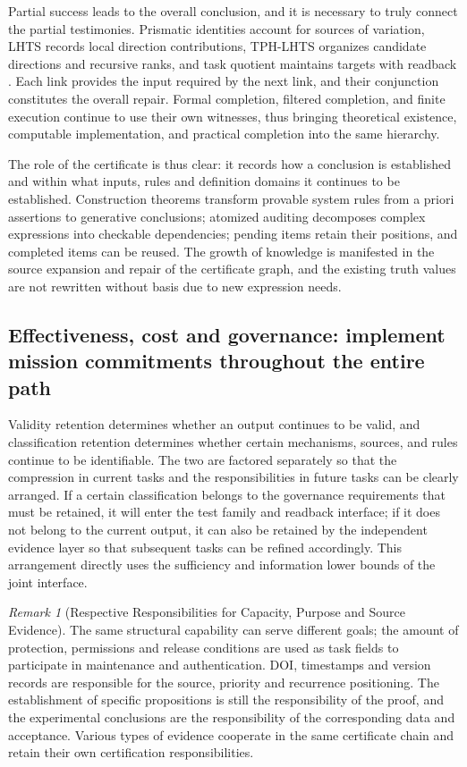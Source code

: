 \documentclass[11pt,a4paper]{article}
\theoremstyle{plain}
\theoremstyle{definition}
\theoremstyle{remark}
\newtheorem{remark}[theorem]{Remark}
\begin{document}
\begin{CJK*}
Partial success leads to the overall conclusion, and it is necessary to truly connect the partial testimonies. Prismatic identities account for sources of variation, LHTS records local direction contributions, TPH-LHTS organizes candidate directions and recursive ranks, and task quotient maintains targets with readback . Each link provides the input required by the next link, and their conjunction constitutes the overall repair. Formal completion, filtered completion, and finite execution continue to use their own witnesses, thus bringing theoretical existence, computable implementation, and practical completion into the same hierarchy.

The role of the certificate is thus clear: it records how a conclusion is established and within what inputs, rules and definition domains it continues to be established. Construction theorems transform provable system rules from a priori assertions to generative conclusions; atomized auditing decomposes complex expressions into checkable dependencies; pending items retain their positions, and completed items can be reused. The growth of knowledge is manifested in the source expansion and repair of the certificate graph, and the existing truth values are not rewritten without basis due to new expression needs.

\subsection { Effectiveness, cost and governance: implement mission commitments throughout the entire path }

Validity retention determines whether an output continues to be valid, and classification retention determines whether certain mechanisms, sources, and rules continue to be identifiable. The two are factored separately so that the compression in current tasks and the responsibilities in future tasks can be clearly arranged. If a certain classification belongs to the governance requirements that must be retained, it will enter the test family and readback interface; if it does not belong to the current output, it can also be retained by the independent evidence layer so that subsequent tasks can be refined accordingly. This arrangement directly uses the sufficiency and information lower bounds of the joint interface.

\begin{remark}
[Respective Responsibilities for Capacity, Purpose and Source Evidence]The same structural capability can serve different goals; the amount of protection, permissions and release conditions are used as task fields to participate in maintenance and authentication. DOI, timestamps and version records are responsible for the source, priority and recurrence positioning. The establishment of specific propositions is still the responsibility of the proof, and the experimental conclusions are the responsibility of the corresponding data and acceptance. Various types of evidence cooperate in the same certificate chain and retain their own certification responsibilities. \cite{S14,S16,S37,S38}\end{remark}



\end{CJK*}
\end{document}

